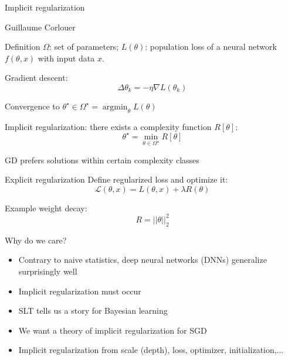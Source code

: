 \documentclass[aspectratio=169]{beamer}
\begin{document}
\begin{frame}[plain]
  \centering
  \vfill
  {\Huge Implicit regularization}

  \vspace{1.5cm}

  {\Large Guillaume Corlouer}
  \vfill
\end{frame}

\begin{frame}{Definition}
  $\Omega$: set of parameters; $L(\theta)$: population loss of a neural network $f(\theta,x)$ with input data $x$.

  \vspace{0.4cm}

  Gradient descent:
  \[
    \Delta \theta_k = -\eta\nabla L(\theta_k)
  \]

  Convergence to $\theta^{\star}\in \Omega^{\star}= \operatorname{argmin}_{\theta} L(\theta)$

  \vspace{0.4cm}

  Implicit regularization: there exists a complexity function $R[\theta]$:
  \[
    \theta^{\star} = \min_{\theta\in \Omega^{\star}} R[\theta]
  \]

  GD prefers solutions within certain complexity classes
\end{frame}

\begin{frame}{Explicit regularization}
  Define regularized loss and optimize it:
  \[
    \mathcal{L}(\theta, x) = L(\theta,x) + \lambda R(\theta)
  \]

  Example weight decay:
  \[
    R = ||\theta||_2^2
  \]
\end{frame}

\begin{frame}{Why do we care?}
  \begin{itemize}
    \item Contrary to naive statistics, deep neural networks (DNNs) generalize surprisingly well
    \item Implicit regularization must occur
    \item SLT tells us a story for Bayesian learning
    \item We want a theory of implicit regularization for SGD
    \item Implicit regularization from scale (depth), loss, optimizer, initialization,...
  \end{itemize}
\end{frame}
\end{document}
